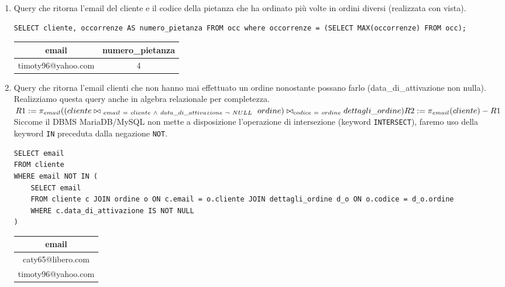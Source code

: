 \documentclass[10pt]{article}
\begin{document}
\begin{enumerate}[noitemsep]
	\item Query che ritorna l'email del cliente e il codice della pietanza che ha ordinato più volte in ordini diversi (realizzata con vista).
%
	\begin{lstlisting}[style=Mysql]
SELECT cliente, occorrenze AS numero_pietanza FROM occ where occorrenze = (SELECT MAX(occorrenze) FROM occ);	\end{lstlisting}
	\begin{table}[ht]
	\centering
		\label{table:query4}
		\begin{tabular}{|c|c|}
			\hline
			\multirow{1}{*}{\textbf{email}} & \multicolumn{1}{c|}{\textbf{numero\_pietanza}}\\
			\hline
			timoty96@yahoo.com & 4\\ 
			\hline
			\end{tabular}
	\end{table}
	\item Query che ritorna l'email clienti che non hanno mai effettuato un ordine nonostante possano farlo (data\_di\_attivazione non nulla).
	Realizziamo questa query anche in algebra relazionale per completezza.\newline
	$ R1:= \pi_{email}((cliente \bowtie_{\ email\ =\ cliente\ \wedge\ data\_di\_attivazione\ \neg\ NULL} \ ordine)\bowtie_{codice\ = \ ordine} dettagli\_ordine)  \\
	R2:= \pi_{email}(cliente) - R1$ \\
	Siccome il DBMS MariaDB/MySQL non mette a disposizione l'operazione di intersezione (keyword \texttt{INTERSECT}), faremo uso della keyword \texttt{IN} preceduta dalla negazione \texttt{NOT}.
	\begin{lstlisting}[style=Mysql]
SELECT email 
FROM cliente 
WHERE email NOT IN (
	SELECT email 
	FROM cliente c JOIN ordine o ON c.email = o.cliente JOIN dettagli_ordine d_o ON o.codice = d_o.ordine 
	WHERE c.data_di_attivazione IS NOT NULL
)	\end{lstlisting}	
	\begin{table}[H]
		\centering
		\label{table:query5}
		\begin{tabular}{|c|}
			\hline
			\textbf{email} \\ \hline
			caty65@libero.com          \\ \hline
			timoty96@yahoo.com          \\	\hline
		\end{tabular}
	\end{table}

\end{enumerate}
\end{document}
